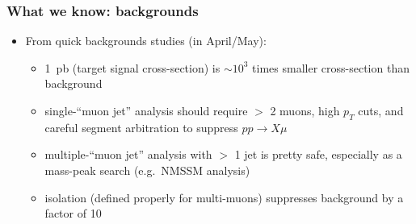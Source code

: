 \documentclass[compress]{beamer}
\begin{document}
\begin{frame}
\frametitle{What we know: backgrounds}

\begin{itemize}
\item From quick backgrounds studies (in April/May):
\begin{itemize}
\item 1~pb (target signal cross-section) is $\sim 10^3$ times smaller cross-section than background
\item single-``muon jet'' analysis should require $>$ 2 muons, high $p_T$
  cuts, and careful segment arbitration to suppress $pp \to X \mu$
\item multiple-``muon jet'' analysis with $>$ 1 jet is pretty safe,
  especially as a mass-peak search (e.g.\ NMSSM analysis)
\item isolation (defined properly for multi-muons) suppresses background by a factor of 10
\end{itemize}
\end{itemize}


\end{frame}
\end{document}
